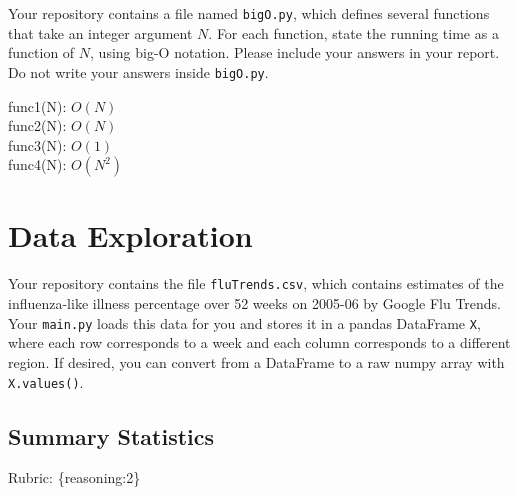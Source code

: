 \documentclass{article}
\def\rubric#1{\gre{Rubric: \{#1\}}}{}
\def\blu#1{{\color{blu}#1}}
\def\gre#1{{\color{gre}#1}}
\def\red#1{{\color{red}#1}}
\begin{document}
Your repository contains a file named \texttt{bigO.py}, which defines several functions
that take an integer argument $N$. For each function, \blu{state the running time as a function of $N$, using big-O notation}.
Please include your answers in your report. Do not write your answers inside \texttt{bigO.py}.

\red{func1(N): $O(N)$} \\
\red{func2(N): $O(N)$} \\
\red{func3(N): $O(1)$} \\
\red{func4(N): $O(N^2)$}
\section{Data Exploration}


Your repository contains the file \texttt{fluTrends.csv}, which contains estimates
of the influenza-like illness percentage over 52 weeks on 2005-06 by Google Flu Trends.
Your \texttt{main.py} loads this data for you and stores it in a pandas DataFrame \texttt{X},
where each row corresponds to a week and each column
corresponds to a different
region. If desired, you can convert from a DataFrame to a raw numpy array with \texttt{X.values()}.

\subsection{Summary Statistics}
\rubric{reasoning:2}
\end{document}

